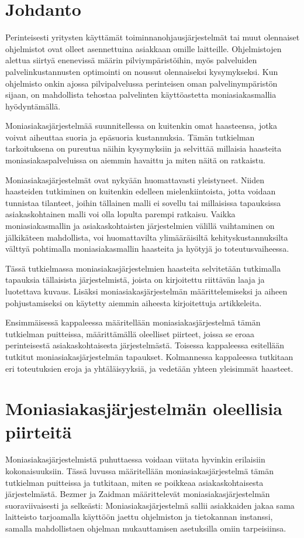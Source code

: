 \chapter{Johdanto}
Perinteisesti yritysten käyttämät toiminnanohjausjärjestelmät tai muut olennaiset ohjelmistot ovat olleet asennettuina asiakkaan omille laitteille. Ohjelmistojen alettua siirtyä enenevissä määrin pilviympäristöihin, myös palveluiden palvelinkustannusten optimointi on noussut olennaiseksi kysymykseksi. Kun ohjelmisto onkin ajossa pilvipalvelussa perinteisen oman palvelinympäristön sijaan, on mahdollista tehostaa palvelinten käyttöastetta moniasiakasmallia hyödyntämällä.

Moniasiakasjärjestelmää suunnitellessa on kuitenkin omat haasteensa, jotka voivat aiheuttaa suoria ja epäsuoria kustannuksia. Tämän tutkielman tarkoituksena on pureutua näihin kysymyksiin ja selvittää millaisia haasteita moniasiakaspalveluissa on aiemmin havaittu ja miten näitä on ratkaistu.

Moniasiakasjärjestelmät ovat nykyään huomattavasti yleistyneet. Niiden haasteiden tutkiminen on kuitenkin edelleen mielenkiintoista, jotta voidaan tunnistaa tilanteet, joihin tällainen malli ei sovellu tai millaisissa tapauksissa asiakaskohtainen malli voi olla lopulta parempi ratkaisu. Vaikka moniasiakasmallin ja asiakaskohtaisten järjestelmien välillä vaihtaminen on jälkikäteen mahdollista, voi huomattavilta ylimääräisiltä kehityskustannuksilta \cite{momm2011qualitative} välttyä pohtimalla moniasiakasmallin haasteita ja hyötyjä jo toteutusvaiheessa.

Tässä tutkielmassa moniasiakasjärjestelmien haasteita selvitetään tutkimalla tapauksia tällaisista järjestelmistä, joista on kirjoitettu riittävän laaja ja luotettava kuvaus. Lisäksi moniasiakasjärjestelmän määrittelemiseksi ja aiheen pohjustamiseksi on käytetty aiemmin aiheesta kirjoitettuja artikkeleita.

Ensimmäisessä kappaleessa määritellään moniasiakasjärjestelmä tämän tutkielman puitteissa, määrittämällä oleelliset piirteet, joissa se eroaa perinteisestä asiakaskohtaisesta järjestelmästä. Toisessa kappaleessa esitellään tutkitut moniasiakasjärjestelmän tapaukset. Kolmannessa kappaleessa tutkitaan eri toteutuksien eroja ja yhtäläisyyksiä, ja vedetään yhteen yleisimmät haasteet.

\chapter{Moniasiakasjärjestelmän oleellisia piirteitä}
Moniasiakasjärjestelmistä puhuttaessa voidaan viitata hyvinkin erilaisiin kokonaisuuksiin. Tässä luvussa määritellään moniasiakasjärjestelmä tämän tutkielman puitteissa ja tutkitaan, miten se poikkeaa asiakaskohtaisesta järjestelmästä. Bezmer ja Zaidman \cite{bezemer2010multi} määrittelevät moniasiakasjärjestelmän suoraviivaisesti ja selkeästi: Moniasiakasjärjestelmä sallii asiakkaiden jakaa sama laitteisto tarjoamalla käyttöön jaettu ohjelmiston ja tietokannan instanssi, samalla mahdollistaen ohjelman mukauttamisen asetuksilla omiin tarpeisiinsa.

